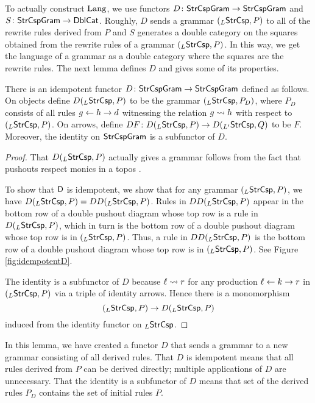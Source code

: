 \documentclass{amsart}
\begin{document}
To actually construct $ \mathrm{Lang} $, we use functors
$ D \colon \mathsf{StrCspGram} \to \mathsf{StrCspGram} $ and
$ S \colon \mathsf{StrCspGram} \to \mathsf{DblCat} $. Roughly, $ D $ sends a
grammar $ ( _L \mathsf{StrCsp} , P ) $ to all of the rewrite rules
derived from $ P $ and $ S $ generates a double category on
the squares obtained from the rewrite rules of a grammar
$ ( _L \mathsf{StrCsp} , P ) $. In this way, we get the language of
a grammar as a double category where the squares are the
rewrite rules.  The next lemma defines $ D $ and gives some
of its properties.

\begin{lemma}
  There is an idempotent functor
  $ D \colon \mathsf{StrCspGram} \to \mathsf{StrCspGram} $ defined as
  follows. On objects define $ D ( _{L}\mathsf{StrCsp} , P ) $ to be
  the grammar $ ( _{L} \mathsf{StrCsp} , P_D) $, where $ P_D $
  consists of all rules $ g \leftarrow h \to d $ witnessing the
  relation $ g \rightsquigarrow h $ with respect to
  $ ( _{L}\mathsf{StrCsp} , P ) $. On arrows, define
  $ DF \colon D( _{L}\mathsf{StrCsp} , P ) \to D( _{L'}\mathsf{StrCsp} , Q )
  $ to be $ F $.  Moreover, the identity on $ \mathsf{StrCspGram} $
  is a subfunctor of $ D $.
\end{lemma}

\begin{proof}
  That $ D ( _{L}\mathsf{StrCsp} , P ) $ actually gives a grammar
  follows from the fact that pushouts respect monics in a
  topos \cite[Lem.~12]{LackSobo_Adhesive}.
  
  To show that $ \mathsf{D} $ is idempotent, we show that for any
  grammar $ ( _{L}\mathsf{StrCsp} , P ) $, we have
  $ D ( _{L}\mathsf{StrCsp} , P ) = DD ( _{L}\mathsf{StrCsp} , P ) $.  Rules
  in $ DD ( _{L}\mathsf{StrCsp} , P ) $ appear in the bottom row of a
  double pushout diagram whose top row is a rule in
  $ D ( _{L}\mathsf{StrCsp} , P ) $, which in turn is the bottom row
  of a double pushout diagram whose top row is in
  $ ( _{L}\mathsf{StrCsp} , P ) $. Thus, a rule in
  $ DD ( _{L}\mathsf{StrCsp} , P ) $ is the bottom row of a double
  pushout diagram whose top row is in
  $ ( _{L}\mathsf{StrCsp} , P ) $. See Figure \ref{fig:idempotentD}.

  

  The identity is a subfunctor of $ D $ because
  $ \ell \rightsquigarrow r $ for any production
  $ \ell \leftarrow k \to r $ in $ ( _{L}\mathsf{StrCsp} , P ) $ via a
  triple of identity arrows. Hence there is a monomorphism
  \[
    ( _L \mathsf{StrCsp} , P ) \to
    D ( _L \mathsf{StrCsp} , P )
  \]
  induced from the identity functor on $ _L\mathsf{StrCsp} $.
\end{proof}

In this lemma, we have created a functor $ D $ that sends a
grammar to a new grammar consisting of
all derived rules.  That $ D $ is idempotent means that all
rules derived from $ P $ can be derived directly; multiple
applications of $ D $ are unnecessary.  That the identity is
a subfunctor of $ D $ means that set of the derived rules
$ P_D $ contains the set of initial rules $ P $.
\end{document}
